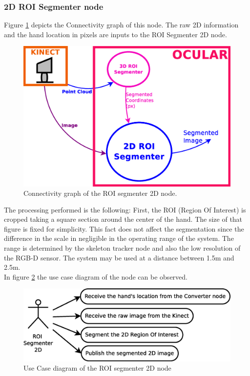 
\subsubsection{2D ROI Segmenter node}
	\label{roi_segmenter_2d}
	
	Figure \ref{node_roi2d} depicts the Connectivity graph of this node. 
	The raw 2D information and the hand location in pixels are inputs to the ROI Segmenter 2D node. 

		\begin{figure}[H]
			\begin{center}
			\includegraphics[width=0.5\linewidth]{img/diagrams/node_roi2d.eps}
			\caption[ROI segmenter 2D node I/O]{Connectivity graph of the ROI segmenter 2D node.}		
			\label{node_roi2d}
			\end{center}
		\end{figure}

	The processing performed is the following: First, the ROI (Region Of Interest) is cropped taking a square section around the center of the hand. 
	The size of that figure is fixed for simplicity. 
	This fact does not affect the segmentation since the difference in the scale in negligible in the operating range of the system. 
	The range is determined by the skeleton tracker node and also the low resolution of the RGB-D sensor. 
	The system may be used at a distance between 1.5m and 2.5m. 
	\\
	In figure \ref{uc_roi2d} the use case diagram of the node can be observed.
	\begin{figure}[H]
		\centering
			\includegraphics[scale=0.4]{img/diagrams/uc_roi_segmenter_2d.eps}
			\caption[Use case diagram ROI segmenter 2D node]{Use Case diagram of the ROI segmenter 2D node}
		\label{uc_roi2d}
	\end{figure}

